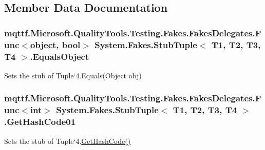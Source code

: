\subsection{Member Data Documentation}
\hypertarget{class_system_1_1_fakes_1_1_stub_tuple_3_01_t1_00_01_t2_00_01_t3_00_01_t4_01_4_ab607235e86fc97cb666af54eafa5be89}{
\subsubsection[{Equals\-Object}]{\setlength{\rightskip}{0pt plus 5cm}mqttf.\-Microsoft.\-Quality\-Tools.\-Testing.\-Fakes.\-Fakes\-Delegates.\-Func$<$object, bool$>$ System.\-Fakes.\-Stub\-Tuple$<$ T1, T2, T3, T4 $>$.Equals\-Object}}\label{class_system_1_1_fakes_1_1_stub_tuple_3_01_t1_00_01_t2_00_01_t3_00_01_t4_01_4_ab607235e86fc97cb666af54eafa5be89}


Sets the stub of Tuple`4.Equals(\-Object obj)

\hypertarget{class_system_1_1_fakes_1_1_stub_tuple_3_01_t1_00_01_t2_00_01_t3_00_01_t4_01_4_a571aba542f69ae42dd1889a08bde7edd}{
\subsubsection[{Get\-Hash\-Code01}]{\setlength{\rightskip}{0pt plus 5cm}mqttf.\-Microsoft.\-Quality\-Tools.\-Testing.\-Fakes.\-Fakes\-Delegates.\-Func$<$int$>$ System.\-Fakes.\-Stub\-Tuple$<$ T1, T2, T3, T4 $>$.Get\-Hash\-Code01}}\label{class_system_1_1_fakes_1_1_stub_tuple_3_01_t1_00_01_t2_00_01_t3_00_01_t4_01_4_a571aba542f69ae42dd1889a08bde7edd}


Sets the stub of Tuple`4.\hyperlink{class_system_1_1_fakes_1_1_stub_tuple_3_01_t1_00_01_t2_00_01_t3_00_01_t4_01_4_ad744f3a9a2103626bc7c4d22136655a4}{Get\-Hash\-Code()}

